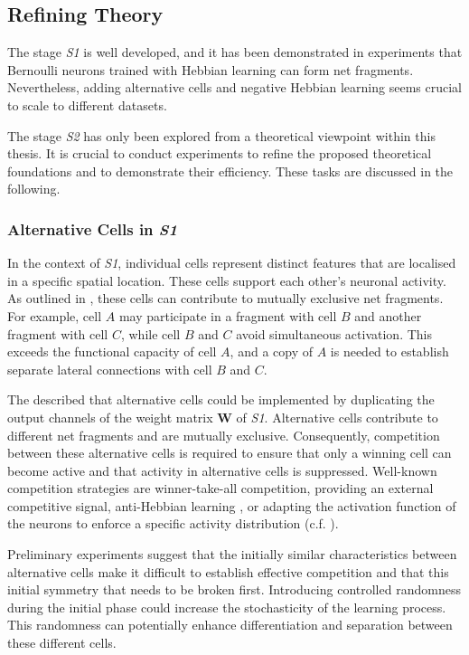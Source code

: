\subsection{Refining Theory}
The stage \emph{S1} is well developed, and it has been demonstrated in experiments that Bernoulli neurons trained with Hebbian learning can form net fragments. Nevertheless, adding alternative cells and negative Hebbian learning seems crucial to scale to different datasets.

The stage \emph{S2} has only been explored from a theoretical viewpoint within this thesis. It is crucial to conduct experiments to refine the proposed theoretical foundations and to demonstrate their efficiency.
These tasks are discussed in the following.


\subsubsection{Alternative Cells in \emph{S1}}
In the context of \emph{S1}, individual cells represent distinct features that are localised in a specific spatial location. These cells support each other's neuronal activity. As outlined in , these cells can contribute to mutually exclusive net fragments. For example, cell $A$ may participate in a fragment with cell $B$ and another fragment with cell $C$, while cell $B$ and $C$ avoid simultaneous activation. This exceeds the functional capacity of cell $A$, and a copy of $A$ is needed to establish separate lateral connections with cell $B$ and $C$.

The  described that alternative cells could be implemented by duplicating the output channels of the weight matrix $\boldsymbol{W}$ of \emph{S1}.
Alternative cells contribute to different net fragments and are mutually exclusive.
Consequently, competition between these alternative cells is required to ensure that only a winning cell can become active and that activity in alternative cells is suppressed.
Well-known competition strategies are winner-take-all competition, providing an external competitive signal, anti-Hebbian learning , or adapting the activation function of the neurons to enforce a specific activity distribution  (c.f. ).

Preliminary experiments suggest that the initially similar characteristics between alternative cells make it difficult to establish effective competition and that this initial symmetry that needs to be broken first.
Introducing controlled randomness during the initial phase could increase the stochasticity of the learning process. This randomness can potentially enhance differentiation and separation between these different cells.

